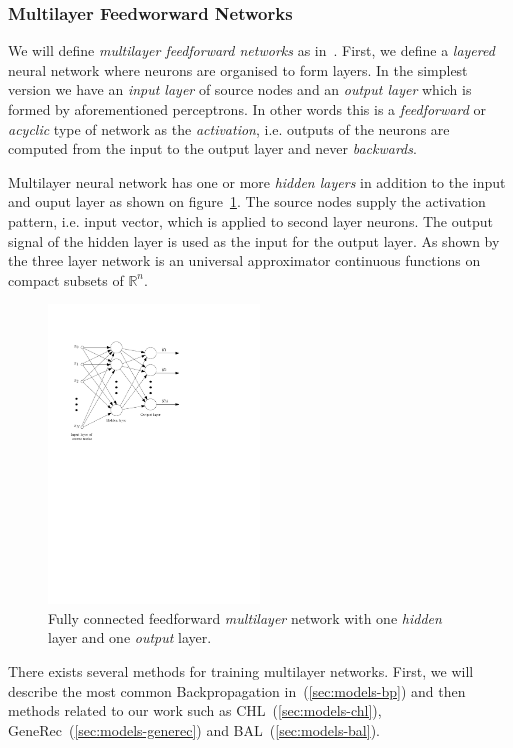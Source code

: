 \subsubsection{Multilayer Feedworward Networks} 
\label{sec:theory-multilayer} 

We will define \emph{multilayer feedforward networks} as in~\citet{haykin1994neural}. First, we define a \emph{layered} neural network where neurons are organised to form layers. In the simplest version we have an \emph{input layer} of source nodes and an \emph{output layer} which is formed by aforementioned perceptrons. In other words this is a \emph{feedforward} or \emph{acyclic} type of network as the \emph{activation}, i.e. outputs of the neurons are computed from the input to the output layer and never \emph{backwards}. 

Multilayer neural network has one or more \emph{hidden layers} in addition to the input and ouput layer as shown on figure~\ref{fig:multilayer}. The source nodes supply the activation pattern, i.e. input vector, which is applied to second layer neurons. The output signal of the hidden layer is used as the input for the output layer. As shown by~\citet{cybenko1989approximation} the three layer network is an universal approximator continuous functions on compact subsets of $\mathbb{R}^n$.

\begin{figure}[H]
  \centering
  \includegraphics[width=0.5\textwidth]{img/multilayer.pdf}    
  \caption{Fully connected feedforward \emph{multilayer} network with one \emph{hidden} layer and one \emph{output} layer. } 
  \label{fig:multilayer}
\end{figure}

There exists several methods for training multilayer networks. First, we will describe the most common Backpropagation in~(\ref{sec:models-bp}) and then methods related to our work such as CHL~(\ref{sec:models-chl}), GeneRec~(\ref{sec:models-generec}) and BAL~(\ref{sec:models-bal}). 

